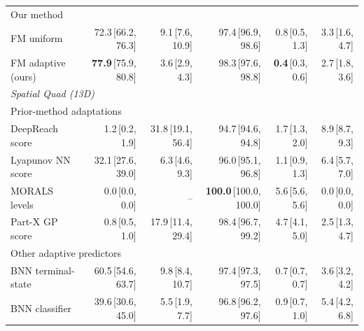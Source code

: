 \begin{tabular}{lrrrrr}
\multicolumn{6}{l}{\footnotesize\color{black!55} Our method} \\
FM uniform & 72.3\,{\scriptsize\color{black!55}[66.2, 76.3]} & 9.1\,{\scriptsize\color{black!55}[7.6, 10.9]} & 97.4\,{\scriptsize\color{black!55}[96.9, 98.6]} & 0.8\,{\scriptsize\color{black!55}[0.5, 1.3]} & 3.3\,{\scriptsize\color{black!55}[1.6, 4.7]} \\
FM adaptive (ours) & \textbf{77.9}\,{\scriptsize\color{black!55}[75.9, 80.8]} & 3.6\,{\scriptsize\color{black!55}[2.9, 4.3]} & 98.3\,{\scriptsize\color{black!55}[97.6, 98.8]} & \textbf{0.4}\,{\scriptsize\color{black!55}[0.3, 0.6]} & 2.7\,{\scriptsize\color{black!55}[1.8, 3.6]} \\
\midrule
\multicolumn{6}{l}{\textit{Spatial Quad (13D)}} \\
\multicolumn{6}{l}{\footnotesize\color{black!55} Prior-method adaptations} \\
DeepReach score & 1.2\,{\scriptsize\color{black!55}[0.2, 1.9]} & 31.8\,{\scriptsize\color{black!55}[19.1, 56.4]} & 94.7\,{\scriptsize\color{black!55}[94.6, 94.8]} & 1.7\,{\scriptsize\color{black!55}[1.3, 2.0]} & 8.9\,{\scriptsize\color{black!55}[8.7, 9.3]} \\
Lyapunov NN score & 32.1\,{\scriptsize\color{black!55}[27.6, 39.0]} & 6.3\,{\scriptsize\color{black!55}[4.6, 9.3]} & 96.0\,{\scriptsize\color{black!55}[95.1, 96.8]} & 1.1\,{\scriptsize\color{black!55}[0.9, 1.3]} & 6.4\,{\scriptsize\color{black!55}[5.7, 7.0]} \\
MORALS levels & 0.0\,{\scriptsize\color{black!55}[0.0, 0.0]} & -- & \textbf{100.0}\,{\scriptsize\color{black!55}[100.0, 100.0]} & 5.6\,{\scriptsize\color{black!55}[5.6, 5.6]} & 0.0\,{\scriptsize\color{black!55}[0.0, 0.0]} \\
Part-X GP score & 0.8\,{\scriptsize\color{black!55}[0.5, 1.0]} & 17.9\,{\scriptsize\color{black!55}[11.4, 29.4]} & 98.4\,{\scriptsize\color{black!55}[96.7, 99.2]} & 4.7\,{\scriptsize\color{black!55}[4.1, 5.0]} & 2.5\,{\scriptsize\color{black!55}[1.3, 4.7]} \\
\multicolumn{6}{l}{\footnotesize\color{black!55} Other adaptive predictors} \\
BNN terminal-state & 60.5\,{\scriptsize\color{black!55}[54.6, 63.7]} & 9.8\,{\scriptsize\color{black!55}[8.4, 10.7]} & 97.4\,{\scriptsize\color{black!55}[97.3, 97.5]} & 0.7\,{\scriptsize\color{black!55}[0.7, 0.7]} & 3.6\,{\scriptsize\color{black!55}[3.2, 4.2]} \\
BNN classifier & 39.6\,{\scriptsize\color{black!55}[30.6, 45.0]} & 5.5\,{\scriptsize\color{black!55}[1.9, 7.7]} & 96.8\,{\scriptsize\color{black!55}[96.2, 97.6]} & 0.9\,{\scriptsize\color{black!55}[0.7, 1.0]} & 5.4\,{\scriptsize\color{black!55}[4.2, 6.8]} \\

\end{tabular}
